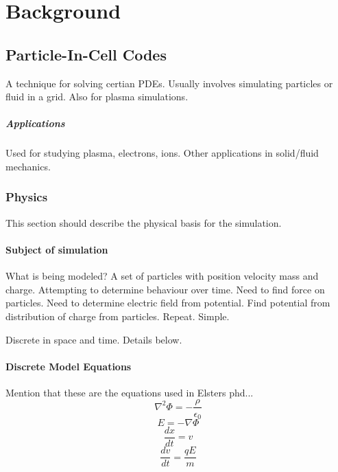 \chapter{Background}

\section{Particle-In-Cell Codes}
A technique for solving certian PDEs. Usually involves simulating particles or
fluid in a grid. Also for plasma simulations.
\paragraph{Applications}
Used for studying plasma, electrons, ions. Other applications in solid/fluid
mechanics.

\subsection{Physics}
This section should describe the physical basis for the simulation.

\subsubsection{Subject of simulation}
What is being modeled?
A set of particles with position velocity mass and charge. Attempting to
determine behaviour over time. Need to find force on particles. Need to
determine electric field from potential. Find potential from distribution of
charge from particles. Repeat. Simple.

Discrete in space and time. Details below.

\subsubsection{Discrete Model Equations}
Mention that these are the equations used in Elsters phd...
\begin{equation} \nabla^2\Phi = -\frac{\rho}{\epsilon _0} \end{equation}
\begin{equation} E = -\nabla\Phi \end{equation}
\begin{equation} \frac{dx}{dt} = v \end{equation}
\begin{equation} \frac{dv}{dt} =\frac{qE}{m} \end{equation}

